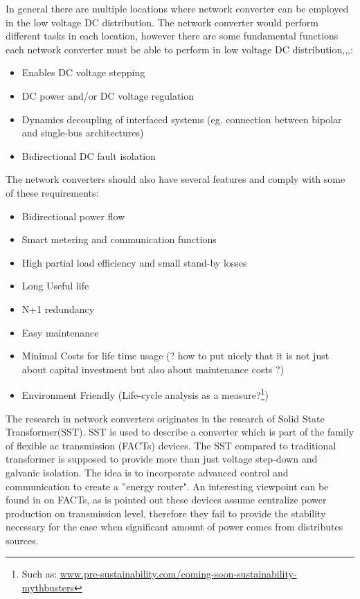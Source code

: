 \documentclass[]{scrartcl}
\begin{document}
In general there are multiple locations where network converter can be employed in the low voltage DC distribution. The network converter would perform different tasks in each location, however there are some fundamental functions each network converter must be able to perform in low voltage DC distribution\cite{Dong2013},\cite{Doncker2014},\cite{FeasibilityofDCtransmissionnetworks},\cite{Jovcic2014}:
\begin{itemize}
	\item Enables DC voltage stepping
	\item DC power and/or DC voltage regulation
	\item Dynamics decoupling of interfaced systems (eg. connection between bipolar and single-bus architectures)
	\item Bidirectional DC fault isolation
\end{itemize}

The network converters should also have several features and comply with some of these requirements:
\begin{itemize}
	\item Bidirectional power flow
	\item Smart metering and communication functions \cite{Liserre2016}
	\item High partial load efficiency and small stand-by losses
	\item Long Useful life
	\item N+1 redundancy
	\item Easy maintenance 
	\item Minimal Costs for life time usage (? how to put nicely that it is not just about capital investment but also about maintenance costs ?)
	\item Environment Friendly (Life-cycle analysis as a measure?\footnote{Such as: \href{https://www.pre-sustainability.com/electric-vehicles-are-best-for-green-mobility-myth-or-not}{www.pre-sustainability.com/coming-soon-sustainability-mythbusters}})
\end{itemize}

The research in network converters originates in the research of Solid State Transformer(SST). SST is used to describe a converter which is part of the family of flexible ac transmission (FACTs) devices. The SST compared to traditional transformer is supposed to provide more than just voltage step-down and galvanic isolation. The idea is to incorporate advanced control and communication to create a ''energy router"\cite{She2012}. An interesting viewpoint can be found in \cite{Doncker2014} on FACTs, as is pointed out these devices assume centralize power production on transmission level, therefore they fail to provide the stability necessary for the case when significant amount of power comes from distributes sources.
\end{document}
